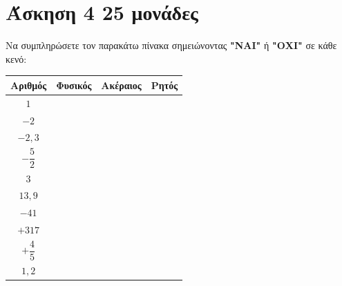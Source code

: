 \documentclass[a4paper,10pt]{report}
\begin{document}
\section*{Άσκηση 4  \hfill \small{25 μονάδες}}
Να συμπληρώσετε τον παρακάτω πίνακα σημειώνοντας \textbf{"ΝΑΙ"} ή \textbf{"ΟΧΙ"} σε κάθε κενό:
\begin{center}
\begin{tabular}{|c|c|c|c|}
\hline
\textbf{Αριθμός}  & \textbf{Φυσικός} & \textbf{Ακέραιος} & \textbf{Ρητός}\\ \hline
$1$ &  & &\\ \hline
$-2$ &  & &\\ \hline
$-2,3$  &  & &\\ \hline 
$-\dfrac{5}{2}$ & &  & \\ \hline
$3$ & &  & \\ \hline
$13,9$ &  & &\\ \hline
$-41$ &  & &\\ \hline
$+317$  &  & &\\ \hline 
$+\dfrac{4}{5}$ & &  & \\ \hline
$1,2$ & &  & \\ \hline
\end{tabular}
\end{center}
\end{document}
